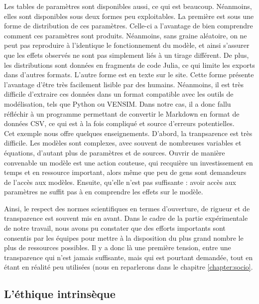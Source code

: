Les tables de paramètres sont disponibles aussi, ce qui est beaucoup. Néanmoins, elles sont disponibles sous deux formes peu exploitables. La première est sous une forme de distribution de ces paramètres. Celle-ci a l'avantage de bien comprendre comment ces paramètres sont produits. Néanmoins, sans graine aléatoire, on ne peut pas reproduire à l'identique le fonctionnement du modèle, et ainsi s'assurer que les effets observés ne sont pas simplement liés à un tirage différent. De plus, les distributions sont données en fragments de code Julia, ce qui limite les exports dans d'autres formats. L'autre forme est en texte sur le site. Cette forme présente l'avantage d'être très facilement lisible par des humains. Néanmoins, il est très difficile d'extraire ces données dans un format compatible avec les outils de modélisation, tels que Python ou VENSIM. Dans notre cas, il a donc fallu réfléchir à un programme permettant de convertir le Markdown en format de données CSV, ce qui est à la fois compliqué et source d'erreurs potentielles. \\

Cet exemple nous offre quelques enseignements. D'abord, la tranpsarence est très difficile. Les modèles sont complexes, avec souvent de nombreuses variables et équations, d'autant plus de paramètres et de sources. Ouvrir de manière convenable un modèle est une action couteuse, qui recquière un investissement en temps et en ressource important, alors même que peu de gens sont demandeurs de l'accès aux modèles. Ensuite, qu'elle n'est pas suffisante : avoir accès aux paramètres ne suffit pas à en comprendre les effets sur le modèle. 

Ainsi, le respect des normes scientifiques en termes d'ouverture, de rigueur et de transparence est souvent mis en avant. Dans le cadre de la partie expérimentale de notre travail, nous avons pu constater que des efforts importants sont consentis par les équipes pour mettre à la disposition du plus grand nombre le plus de ressources possibles.  Il y a donc là une première tension, entre une transparence qui n'est jamais suffisante, mais qui est pourtant demandée, tout en étant en réalité peu utilisées (nous en reparlerons dans le chapitre \ref{chapter:socio}. 


\subsection{L'éthique intrinsèque}

